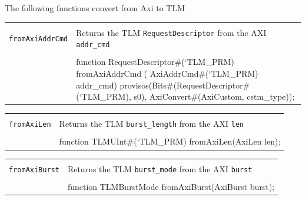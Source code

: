 \documentclass[twoside,letterpaper]{article}
\newcommand{\te}[1]{\texttt{#1}}
\newenvironment{libverbatim}
  {\vspace*{-1.0em}
   \verbatim}
  {\endverbatim
  }
\begin{document}
The following functions convert from Axi to TLM


\begin{center}
\begin{tabular}{|p{1.2 in}|p{5 in}|}
\hline 
&\\
\te{fromAxiAddrCmd}& Returns the TLM \te{RequestDescriptor} from the
AXI \te{addr\_cmd}  \\
&\\
\cline{2-2}
&\begin{libverbatim}
function RequestDescriptor#(`TLM_PRM) fromAxiAddrCmd (
              AxiAddrCmd#(`TLM_PRM) addr_cmd)
   provisos(Bits#(RequestDescriptor#(`TLM_PRM), s0),
            AxiConvert#(AxiCustom, cstm_type));
\end{libverbatim}
\\
\hline
\end{tabular}
\end{center}


\begin{center}
\begin{tabular}{|p{1.2 in}|p{5 in}|}
\hline 
&\\
\te{fromAxiLen}& Returns the TLM \te{burst\_length} from the AXI \te{len}  \\
&\\
\cline{2-2}
&\begin{libverbatim}
function TLMUInt#(`TLM_PRM) fromAxiLen(AxiLen len);
\end{libverbatim}
\\
\hline
\end{tabular}
\end{center}



\begin{center}
\begin{tabular}{|p{1.2 in}|p{5 in}|}
\hline 
&\\
\te{fromAxiBurst}& Returns the TLM \te{burst\_mode} from the AXI \te{burst}  \\
&\\
\cline{2-2}
&\begin{libverbatim}
function TLMBurstMode fromAxiBurst(AxiBurst burst);
\end{libverbatim}
\\
\hline
\end{tabular}
\end{center}
\end{document}
